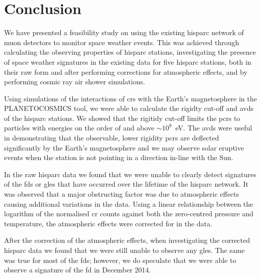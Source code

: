 %




\section{Conclusion}\label{sec:HS_conclusion}

We have presented a feasibility study on using the existing \gls{hisparc} network of muon detectors to monitor space weather events. This was achieved through calculating the observing properties of \gls{hisparc} stations, investigating the presence of space weather signatures in the existing data for five \gls{hisparc} stations, both in their raw form and after performing corrections for atmospheric effects, and by performing cosmic ray air shower simulations.

Using simulations of the interactions of \glspl{cr} with the Earth's magnetosphere in the PLANETOCOSMICS tool, we were able to calculate the rigidty cut-off and \glspl{avd} of the \gls{hisparc} stations. We showed that the rigitidy cut-off limits the \glspl{pcr} to particles with energies on the order of and above $\sim 10^9$~eV. The \glspl{avd} were useful in demonstrating that the observable, lower rigidity \glspl{pcr} are deflected significantly by the Earth's magnetosphere and we may observe solar eruptive events when the station is not pointing in a direction in-line with the Sun.

In the raw \gls{hisparc} data we found that we were unable to clearly detect signatures of the \glspl{fd} or \glspl{gle} that have occurred over the lifetime of the \gls{hisparc} network. It was observed that a major obstructing factor was due to atmospheric effects causing additional variations in the data. Using a linear relationship between the logarithm of the normalised \gls{cr} counts against both the zero-centred pressure and temperature, the atmospheric effects were corrected for in the data.

After the correction of the atmospheric effects, when investigating the corrected \gls{hisparc} data we found that we were still unable to observe any \glspl{gle}. The same was true for most of the \glspl{fd}; however, we do speculate that we were able to observe a signature of the \gls{fd} in December 2014. 

